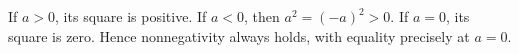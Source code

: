 If $a>0$, its square is positive. If $a<0$, then $a^2=(-a)^2>0$. If $a=0$, its square is zero. Hence nonnegativity always holds, with equality precisely at $\boxed{a=0}$.
